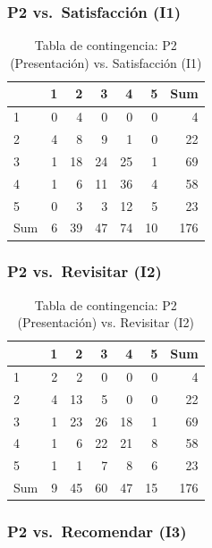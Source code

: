 \documentclass[
  spanish,
]{article}
\begin{document}
\subsubsection{P2 vs.~Satisfacción
(I1)}\label{p2-vs.-satisfacciuxf3n-i1}

\begin{table}[!h]
\centering
\caption{\label{tab:cont-p2-satisf}Tabla de contingencia: P2 (Presentación) vs. Satisfacción (I1)}
\centering
\begin{tabular}[t]{lrrrrrr}
\toprule
  & 1 & 2 & 3 & 4 & 5 & Sum\\
\midrule
1 & 0 & 4 & 0 & 0 & 0 & 4\\
2 & 4 & 8 & 9 & 1 & 0 & 22\\
3 & 1 & 18 & 24 & 25 & 1 & 69\\
4 & 1 & 6 & 11 & 36 & 4 & 58\\
5 & 0 & 3 & 3 & 12 & 5 & 23\\
\addlinespace
Sum & 6 & 39 & 47 & 74 & 10 & 176\\
\bottomrule
\end{tabular}
\end{table}

\subsubsection{P2 vs.~Revisitar (I2)}\label{p2-vs.-revisitar-i2}

\begin{table}[!h]
\centering
\caption{\label{tab:cont-p2-revis}Tabla de contingencia: P2 (Presentación) vs. Revisitar (I2)}
\centering
\begin{tabular}[t]{lrrrrrr}
\toprule
  & 1 & 2 & 3 & 4 & 5 & Sum\\
\midrule
1 & 2 & 2 & 0 & 0 & 0 & 4\\
2 & 4 & 13 & 5 & 0 & 0 & 22\\
3 & 1 & 23 & 26 & 18 & 1 & 69\\
4 & 1 & 6 & 22 & 21 & 8 & 58\\
5 & 1 & 1 & 7 & 8 & 6 & 23\\
\addlinespace
Sum & 9 & 45 & 60 & 47 & 15 & 176\\
\bottomrule
\end{tabular}
\end{table}

\subsubsection{P2 vs.~Recomendar (I3)}\label{p2-vs.-recomendar-i3}
\end{document}
